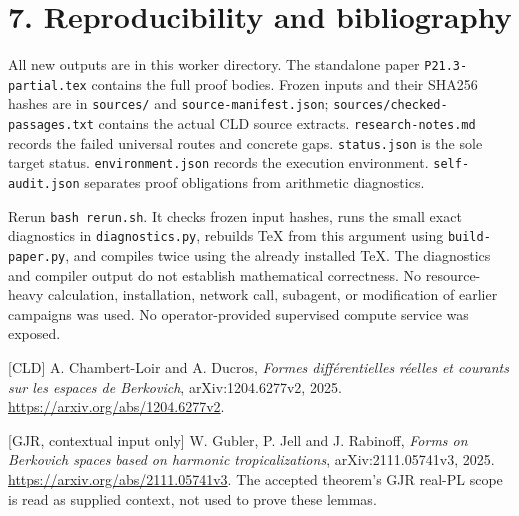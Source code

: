 \documentclass[
  11pt,
]{article}
\begin{document}
\section{7. Reproducibility and
bibliography}\label{reproducibility-and-bibliography}

All new outputs are in this worker directory. The standalone paper
\texttt{P21.3-partial.tex} contains the full proof bodies. Frozen inputs
and their SHA256 hashes are in \texttt{sources/} and
\texttt{source-manifest.json}; \texttt{sources/checked-passages.txt}
contains the actual CLD source extracts. \texttt{research-notes.md}
records the failed universal routes and concrete gaps.
\texttt{status.json} is the sole target status.
\texttt{environment.json} records the execution environment.
\texttt{self-audit.json} separates proof obligations from arithmetic
diagnostics.

Rerun \texttt{bash\ rerun.sh}. It checks frozen input hashes, runs the
small exact diagnostics in \texttt{diagnostics.py}, rebuilds TeX from
this argument using \texttt{build-paper.py}, and compiles twice using
the already installed TeX. The diagnostics and compiler output do not
establish mathematical correctness. No resource-heavy calculation,
installation, network call, subagent, or modification of earlier
campaigns was used. No operator-provided supervised compute service was
exposed.

{[}CLD{]} A. Chambert-Loir and A. Ducros, \emph{Formes différentielles
réelles et courants sur les espaces de Berkovich}, arXiv:1204.6277v2,
2025. \url{https://arxiv.org/abs/1204.6277v2}.

{[}GJR, contextual input only{]} W. Gubler, P. Jell and J. Rabinoff,
\emph{Forms on Berkovich spaces based on harmonic tropicalizations},
arXiv:2111.05741v3, 2025. \url{https://arxiv.org/abs/2111.05741v3}. The
accepted theorem's GJR real-PL scope is read as supplied context, not
used to prove these lemmas.
\end{document}
